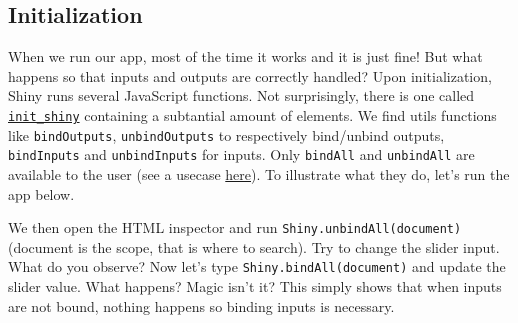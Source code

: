 \documentclass[]{book}
\newenvironment{Shaded}{\begin{snugshade}}{\end{snugshade}}
\newcommand{\ControlFlowTok}[1]{\textcolor[rgb]{0.13,0.29,0.53}{\textbf{#1}}}
\newcommand{\DataTypeTok}[1]{\textcolor[rgb]{0.13,0.29,0.53}{#1}}
\newcommand{\DecValTok}[1]{\textcolor[rgb]{0.00,0.00,0.81}{#1}}
\newcommand{\KeywordTok}[1]{\textcolor[rgb]{0.13,0.29,0.53}{\textbf{#1}}}
\newcommand{\NormalTok}[1]{#1}
\newcommand{\OperatorTok}[1]{\textcolor[rgb]{0.81,0.36,0.00}{\textbf{#1}}}
\newcommand{\StringTok}[1]{\textcolor[rgb]{0.31,0.60,0.02}{#1}}
\begin{document}
\hypertarget{initialization}{%
\subsection{Initialization}\label{initialization}}

When we run our app, most of the time it works and it is just fine! But what happens so that inputs and outputs are correctly handled? Upon initialization, Shiny runs several JavaScript functions. Not surprisingly, there is one called \href{https://github.com/rstudio/shiny/blob/master/srcjs/init_shiny.js}{\texttt{init\_shiny}} containing a subtantial amount of elements. We find utils functions like \texttt{bindOutputs}, \texttt{unbindOutputs} to respectively bind/unbind outputs, \texttt{bindInputs} and \texttt{unbindInputs} for inputs. Only \texttt{bindAll} and \texttt{unbindAll} are available to the user (see a usecase \href{https://stackoverflow.com/questions/51633326/dateinput-not-working-on-dt-in-shiny}{here}). To illustrate what they do, let's run the app below.

\begin{Shaded}
\end{Shaded}

We then open the HTML inspector and run \texttt{Shiny.unbindAll(document)} (document is the scope, that is where to search). Try to change the slider input. What do you observe? Now let's type \texttt{Shiny.bindAll(document)} and update the slider value. What happens? Magic isn't it? This simply shows that when inputs are not bound, nothing happens so binding inputs is necessary.
\end{document}
